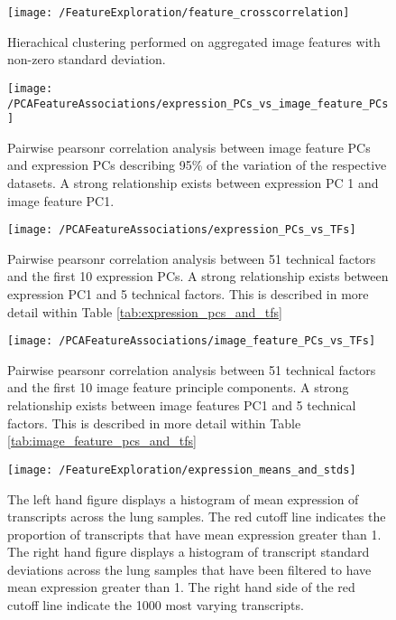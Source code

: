 \documentclass[graybox]{svmult}
\begin{document}
\begin{figure}[H]
\centering
\texttt{[image: /FeatureExploration/feature\_crosscorrelation]}
\caption{Hierachical clustering performed on aggregated image features with non-zero standard deviation.}
\label{fig:feature_cross_correlation}
\end{figure}

\begin{figure}[H]
\centering
\texttt{[image: /PCAFeatureAssociations/expression\_PCs\_vs\_image\_feature\_PCs]}
\caption{Pairwise pearsonr correlation analysis between image feature PCs and expression PCs describing 95\% of the variation of the respective datasets. A strong relationship exists between expression PC 1 and image feature PC1.}
\label{fig:expression_PCs_vs_image_feature_PCs}
\end{figure}


\begin{figure}[H]
\centering
\texttt{[image: /PCAFeatureAssociations/expression\_PCs\_vs\_TFs]}
\caption{Pairwise pearsonr correlation analysis between 51 technical factors and the first 10 expression PCs. A strong relationship exists between expression PC1 and 5 technical factors. This is described in more detail within Table \ref{tab:expression_pcs_and_tfs} }
\label{fig:expression_PCs_vs_TFs}
\end{figure}

\begin{figure}[H]
\centering
\texttt{[image: /PCAFeatureAssociations/image\_feature\_PCs\_vs\_TFs]}
\caption{Pairwise pearsonr correlation analysis between 51 technical factors and the first 10 image feature principle components. A strong relationship exists between image features PC1 and 5 technical factors. This is described in more detail within Table \ref{tab:image_feature_pcs_and_tfs} }
\label{fig:technical_factors_vs_pca_feature}
\end{figure}

\begin{figure}[H]
\centering
\texttt{[image: /FeatureExploration/expression\_means\_and\_stds]}
\caption{The left hand figure displays a histogram of mean expression of transcripts across the lung samples. The red cutoff line indicates the proportion of transcripts that have mean expression greater than 1. The right hand figure displays a histogram of transcript standard deviations across the lung samples that have been filtered to have mean expression greater than 1. The right hand side of the red cutoff line indicate the 1000 most varying transcripts.}
\label{fig:expression_means_and_stds}
\end{figure}
\end{document}

